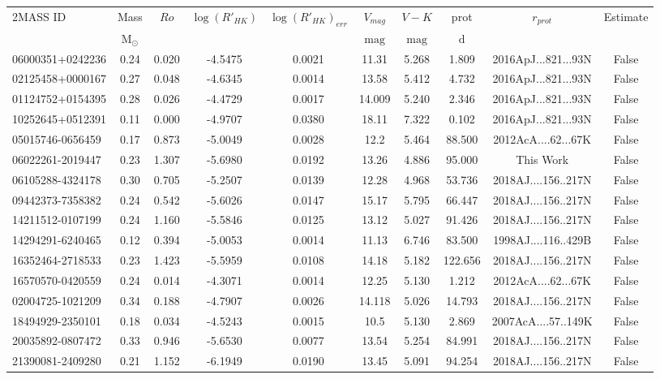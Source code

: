\begin{tabular}{lccccccccc}
\hline
2MASS ID & Mass & $Ro$ & $\log(R'_{HK})$ & $\log(R'_{HK})_{err}$ & $V_{mag}$ & $V-K$ & prot & $r_{prot}$ & Estimate \\
 & $\mathrm{M_{\odot}}$ &  &  &  & $\mathrm{mag}$ & $\mathrm{mag}$ & $\mathrm{d}$ &  &  \\
\hline
\hline
06000351+0242236 & 0.24 & 0.020 & -4.5475 & 0.0021 & 11.31 & 5.268 & 1.809 & 2016ApJ...821...93N & False \\
02125458+0000167 & 0.27 & 0.048 & -4.6345 & 0.0014 & 13.58 & 5.412 & 4.732 & 2016ApJ...821...93N & False \\
01124752+0154395 & 0.28 & 0.026 & -4.4729 & 0.0017 & 14.009 & 5.240 & 2.346 & 2016ApJ...821...93N & False \\
10252645+0512391 & 0.11 & 0.000 & -4.9707 & 0.0380 & 18.11 & 7.322 & 0.102 & 2016ApJ...821...93N & False \\
05015746-0656459 & 0.17 & 0.873 & -5.0049 & 0.0028 & 12.2 & 5.464 & 88.500 & 2012AcA....62...67K & False \\
06022261-2019447 & 0.23 & 1.307 & -5.6980 & 0.0192 & 13.26 & 4.886 & 95.000 & This Work & False \\
06105288-4324178 & 0.30 & 0.705 & -5.2507 & 0.0139 & 12.28 & 4.968 & 53.736 & 2018AJ....156..217N & False \\
09442373-7358382 & 0.24 & 0.542 & -5.6026 & 0.0147 & 15.17 & 5.795 & 66.447 & 2018AJ....156..217N & False \\
14211512-0107199 & 0.24 & 1.160 & -5.5846 & 0.0125 & 13.12 & 5.027 & 91.426 & 2018AJ....156..217N & False \\
14294291-6240465 & 0.12 & 0.394 & -5.0053 & 0.0014 & 11.13 & 6.746 & 83.500 & 1998AJ....116..429B & False \\
16352464-2718533 & 0.23 & 1.423 & -5.5959 & 0.0108 & 14.18 & 5.182 & 122.656 & 2018AJ....156..217N & False \\
16570570-0420559 & 0.24 & 0.014 & -4.3071 & 0.0014 & 12.25 & 5.130 & 1.212 & 2012AcA....62...67K & False \\
02004725-1021209 & 0.34 & 0.188 & -4.7907 & 0.0026 & 14.118 & 5.026 & 14.793 & 2018AJ....156..217N & False \\
18494929-2350101 & 0.18 & 0.034 & -4.5243 & 0.0015 & 10.5 & 5.130 & 2.869 & 2007AcA....57..149K & False \\
20035892-0807472 & 0.33 & 0.946 & -5.6530 & 0.0077 & 13.54 & 5.254 & 84.991 & 2018AJ....156..217N & False \\
21390081-2409280 & 0.21 & 1.152 & -6.1949 & 0.0190 & 13.45 & 5.091 & 94.254 & 2018AJ....156..217N & False \\

\end{tabular}
